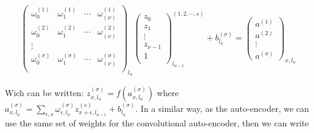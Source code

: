 \documentclass[final, paper=letter,5p,times,twocolumn]{elsarticle}
\begin{document}
\begin{eqnarray*}
  \left(
  \begin{array}{cccc}
    \omega_{0}^{(1)} & \omega_{1}^{(1)} & \cdots & \omega_{(\nu)}^{(1)} \\
    \omega_{0}^{(2)} & \omega_{1}^{(2)} & \cdots & \omega_{(\nu)}^{(2)} \\
    \vdots \\
    \omega_{0}^{(\sigma)} & \omega_{1}^{(\sigma)} & \cdots & \omega_{(\nu)}^{(\sigma)} \\
  \end{array}
  \right)_{l_{u}} \left(
  \begin{array}{c}
    z_{0} \\
    z_{1} \\
    \vdots \\
    z_{\nu-1} \\
    1 \\
  \end{array}
  \right)_{l_{u-1}}^{(1,2,\cdots,s)} + b_{l_{u}}^{(\sigma)}= \left(
  \begin{array}{c}
    a^{(1)} \\
    a^{(2)} \\
    \vdots \\
    a^{(\sigma)} 
  \end{array}
  \right)_{x,l_{u}}
\end{eqnarray*}

Wich can be written: $z_{x,l_{u}}^{(\sigma)} = f(a_{x,l_{u}}^{(\sigma)})$ where $a_{x,l_{u}}^{(\sigma)} = \sum_{\epsilon,s} \omega_{\epsilon,l_{u}}^{(\sigma)}z_{x+\epsilon,l_{u-1}}^{(s)} + b_{l_{u}}^{(\sigma)}$. In a similar way, as the auto-encoder, we can use the same set of weights for the convolutional auto-encoder, then we can write
\end{document}
